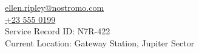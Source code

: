 \href{mailto:ellen.ripley@nostromo.com}{ellen.ripley@nostromo.com} \\
\href{tel:+23-555-0199}{+23 555 0199} \\
Service Record ID: N7R-422 \\
Current Location: Gateway Station, Jupiter Sector \\ \\

